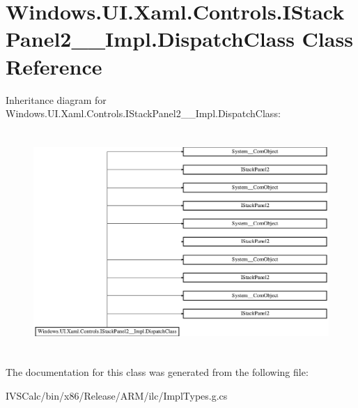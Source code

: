 \hypertarget{class_windows_1_1_u_i_1_1_xaml_1_1_controls_1_1_i_stack_panel2_____impl_1_1_dispatch_class}{}\section{Windows.\+U\+I.\+Xaml.\+Controls.\+I\+Stack\+Panel2\+\_\+\+\_\+\+Impl.\+Dispatch\+Class Class Reference}
\label{class_windows_1_1_u_i_1_1_xaml_1_1_controls_1_1_i_stack_panel2_____impl_1_1_dispatch_class}
Inheritance diagram for Windows.\+U\+I.\+Xaml.\+Controls.\+I\+Stack\+Panel2\+\_\+\+\_\+\+Impl.\+Dispatch\+Class\+:\begin{figure}[H]
\begin{center}
\leavevmode
\includegraphics[height=8.438356cm]{class_windows_1_1_u_i_1_1_xaml_1_1_controls_1_1_i_stack_panel2_____impl_1_1_dispatch_class}
\end{center}
\end{figure}


The documentation for this class was generated from the following file\+:\begin{DoxyCompactItemize}
\item 
I\+V\+S\+Calc/bin/x86/\+Release/\+A\+R\+M/ilc/Impl\+Types.\+g.\+cs\end{DoxyCompactItemize}

